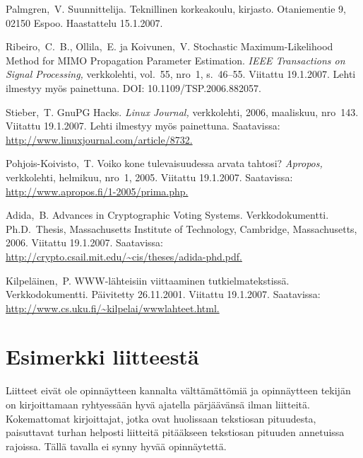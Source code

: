 \documentclass[english,12pt,a4paper,pdftex,elec,utf8]{aaltothesis}
\begin{document}
\begin{thebibliography}{99}
 Palmgren,\ V. Suunnittelija. Teknillinen
  korkeakoulu, kirjasto. Otaniementie 9, 02150 Espoo. Haastattelu
  15.1.2007.

 Ribeiro,\ C.\ B., Ollila,\ E. ja Koivunen,\ V.
  \foreignlanguage{english}{Stochastic Maximum-Likelihood Method for
    MIMO Propagation Parameter Estimation.}
 \textit{IEEE Transactions
    on Signal Processing,} verkkolehti, vol.\ 55, nro~1, s.\ 46--55.
  Viitattu 19.1.2007. Lehti ilmestyy my\"os painettuna. DOI:
  10.1109/TSP.2006.882057.

 Stieber,\ T. GnuPG Hacks. \textit{Linux Journal,}
  verkkolehti, 2006, maaliskuu, nro~143. Viitattu 19.1.2007. Lehti
  ilmestyy my\"os painettuna. Saatavissa:
  \url{http://www.linuxjournal.com/article/8732.}

 Pohjois-Koivisto,\ T. Voiko kone tulevaisuudessa arvata
  tahtosi?  \textit{Apropos,} verkkolehti, helmikuu, nro~1, 2005.
  Viitattu 19.1.2007.  Saatavissa:
  \url{http://www.apropos.fi/1-2005/prima.php.}

 Adida,\ B.  Advances in Cryptographic Voting Systems.
  Verkkodokumentti. Ph.D.\ Thesis, Massachusetts Institute of
  Technology, Cambridge,
  \foreignlanguage{english}{Massachusetts,}
  2006. Viitattu 19.1.2007.  Saatavissa:
  \url{http://crypto.csail.mit.edu/~cis/theses/adida-phd.pdf.}

 Kilpel\"ainen,\ P. WWW-l\"ahteisiin viittaaminen
  tutkielmatekstiss\"a. Verkkodokumentti. P\"aivitetty 26.11.2001.
  Viitattu 19.1.2007. Saatavissa:
  \url{http://www.cs.uku.fi/~kilpelai/wwwlahteet.html.}

\end{thebibliography}

\clearpage

\thesisappendix

\section{Esimerkki liitteest\"a\label{LiiteA}}

Liitteet eiv\"at ole opinn\"aytteen kannalta v\"altt\"am\"att\"omi\"a ja
opinn\"aytteen tekij\"an on
kirjoittamaan ryhtyess\"a\"an hyv\"a ajatella p\"arj\"a\"av\"ans\"a ilman liitteit\"a.
Kokemattomat kirjoittajat, jotka ovat huolissaan
tekstiosan pituudesta, paisuttavat turhan
helposti liitteit\"a pit\"a\"akseen tekstiosan pituuden annetuissa rajoissa.
T\"all\"a tavalla ei synny hyv\"a\"a opinn\"aytett\"a.
\end{document}
